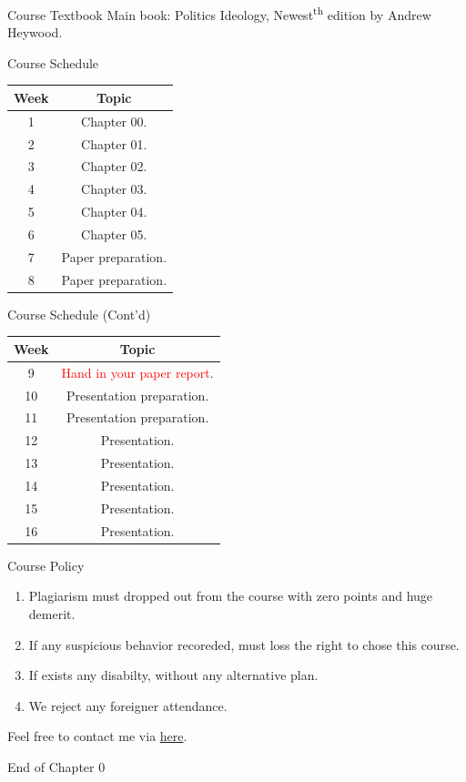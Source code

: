 \documentclass{beamer}
\begin{document}
\begin{frame}{Course Textbook}
\pause
Main book: Politics Ideology, Newest\textsuperscript{th} edition by Andrew Heywood. \\
\end{frame}
\begin{frame}{Course Schedule}
\begin{center}
\begin{tabular}{|c|c|}
\hline
Week & Topic \\
\hline
1 & Chapter 00.\\
\hline
2 & Chapter 01.\\
\hline
3 & Chapter 02.\\
\hline
4 & Chapter 03.\\
\hline
5 & Chapter 04.\\
\hline
6 & Chapter 05.\\
\hline
7 & Paper preparation.\\
\hline
8 & Paper preparation.\\
\hline
\end{tabular}
\end{center}
\end{frame}
\begin{frame}{Course Schedule (Cont'd)}
\begin{center}
\begin{tabular}{|c|c|}
\hline
Week & Topic \\
\hline
9 & \textcolor{red}{Hand in your paper report}.\\
\hline
10 & Presentation preparation.\\
\hline
11 & Presentation preparation.\\
\hline
12 & Presentation.\\
\hline
13 & Presentation.\\
\hline
14 & Presentation.\\
\hline
15 & Presentation.\\
\hline
16 & Presentation.\\
\hline
\end{tabular}
\end{center}
\end{frame}
\begin{frame}{Course Policy}
\begin{enumerate}
\pause
\item Plagiarism must dropped out from the course with zero points and huge demerit. \\
\pause
\item If any suspicious behavior recoreded, must loss the right to chose this course. \\
\pause
\item If exists any disabilty, without any alternative plan. \\
\pause
\item We reject any foreigner attendance. \\
\end{enumerate}
\end{frame}
\begin{frame}{}
\begin{center}
\Large{Feel free to contact me via \href{mailto:politics.tchsiao@gmail.com}{here}.}
\end{center}
\end{frame}
\begin{frame}{}
\begin{center}
\Large{End of Chapter 0}
\end{center}
\end{frame}
\end{document}
